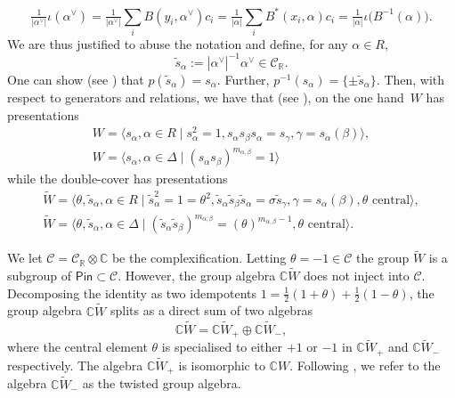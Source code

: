 \documentclass[10pt,a4paper]{amsart}
\numberwithin{equation}{section}
\newcommand{\bbc}{\mathbb{C}}
\newcommand{\bbr}{\mathbb{R}}
\newcommand{\Cc}{\mathcal{C}}
\newcommand{\Pin}{\mathsf{Pin}}
\begin{document}
\[
\tfrac{1}{|\alpha^\vee|}\iota(\alpha^\vee)
= \tfrac{1}{|\alpha^\vee|}\sum_i B(y_i,\alpha^\vee) c_i
= \tfrac{1}{|\alpha|}\sum_i B^*(x_i,\alpha) c_i
= \tfrac{1}{|\alpha|}\iota\big(B^{-1}(\alpha)\big).
\]
We are thus justified to abuse the notation and define, for any $\alpha\in R$, \[\tilde{s}_\alpha := |\alpha^\vee|^{-1}\alpha^\vee \in \mathcal{C}_\bbr.\]
One can show (see \cite[Proposition~2.6]{M76}) that $p(\tilde{s}_\alpha) = s_\alpha$. Further, $p^{-1}(s_\alpha) = \{\pm \tilde{s}_\alpha\}$. Then, with respect to generators and relations, we have that (see \cite[Theorem~4.2]{M76}), on the one hand~$W$ has presentations
\begin{gather*}
W = \langle s_\alpha,\alpha\in R\mid s_\alpha^2=1,s_\alpha s_\beta s_\alpha = s_\gamma,\gamma = s_\alpha(\beta)\rangle,
\\
W = \langle s_\alpha,\alpha\in \Delta \mid (s_\alpha s_\beta)^{m_{\alpha,\beta}} = 1 \rangle
\end{gather*}
while the double-cover has presentations
\begin{gather}\label{e:PinPresentation}
\tilde{W} = \langle \theta, \tilde{s}_\alpha,\alpha\in R\mid \tilde{s}_\alpha^2=1=\theta^2,\tilde{s}_\alpha \tilde{s}_\beta \tilde{s}_\alpha = \sigma\tilde{s}_\gamma,\gamma = s_\alpha(\beta), \theta \text{ central}\rangle,\\
\label{e:PinPresentationmalpha}
\tilde{W} = \langle \theta, \tilde{s}_\alpha,\alpha\in \Delta \mid (\tilde{s}_\alpha \tilde{s}_\beta)^{m_{\alpha,\beta}} = (\theta)^{m_{\alpha,\beta}-1}, \theta \text{ central}\rangle.
\end{gather}

 We let $\mathcal{C} = \mathcal{C}_\bbr\otimes \bbc$ be the complexification. Letting $\theta = -1 \in \Cc$ the group $\tilde{W}$ is a subgroup of $\Pin \subset\Cc$. However, the group algebra $\mathbb{C}\tilde{W}$ does not inject into $\Cc$. Decomposing the identity as two idempotents $1 = \tfrac{1}{2}(1+\theta) + \tfrac{1}{2}(1-\theta)$, the group algebra $\mathbb{C}\tilde{W}$ splits as a direct sum of two algebras
 \begin{equation}\label{eq::twistedgroupalg} \mathbb{C}\tilde{W} =\mathbb{C}\tilde{W}_+ \oplus \mathbb{C}\tilde{W}_-,
 \end{equation}
 where the central element $\theta$ is specialised to either $+1$ or $-1$ in $\mathbb{C}\tilde{W}_+$ and $\mathbb{C}\tilde{W}_-$ respectively. The algebra $\mathbb{C}\tilde{W}_+$ is isomorphic to $\mathbb{C}W$. Following \cite{K05}, we refer to the algebra $\mathbb{C}\tilde{W}_-$ as the twisted group algebra.
\end{document}
